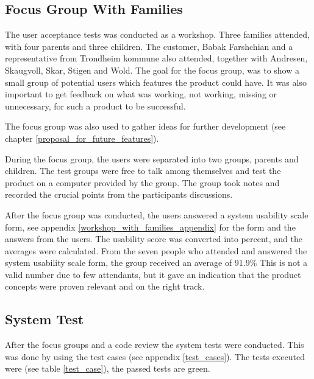 \subsection{Focus Group With Families}
\label{focusGroup}
The user acceptance tests was conducted as a workshop. Three families attended, with four parents and three children. The customer, Babak Farshchian and a representative from Trondheim kommune also attended, together with Andresen, Skaugvoll, Skar, Stigen and Wold. The goal for the focus group, was to show a small group of potential users which features the product could have. It was also important to get feedback on what was working, not working, missing or unnecessary, for such a product to be successful.

The focus group was also used to gather ideas for further development (see chapter \ref{proposal_for_future_features}). 

During the focus group, the users were separated into two groups, parents and children. The test groups were free to talk among themselves and test the product on a computer provided by the group. The group took notes and recorded the crucial points from the participants discussions.

After the focus group was conducted, the users answered a system usability scale form, see appendix \ref{workshop_with_families_appendix} for the form and the answers from the users. The usability score was converted into percent, and the averages were calculated. From the seven people who attended and answered the system usability scale form, the group received an average of 91.9\% This is not a valid number due to few attendants, but it gave an indication that the product concepts were proven relevant and on the right track.

\subsection{System Test}
After the focus groups and a code review the system tests were conducted. This was done by using the test cases (see appendix \ref{test_cases}). The tests executed were (see table \ref{test_case}), the passed tests are green. 

